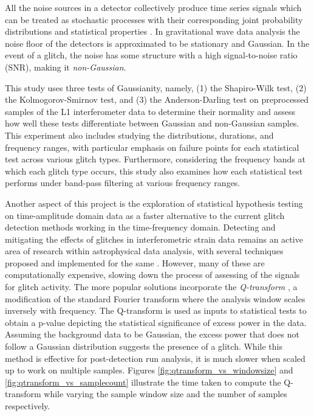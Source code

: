 \documentclass[12pt]{article}
\begin{document}

\medskip
\noindent All the noise sources in a detector collectively produce time series signals which can be treated as stochastic processes with their corresponding joint probability distributions and statistical properties \cite{collaboration_guide_2020}. In gravitational wave data analysis the noise floor of the detectors is approximated to be stationary and Gaussian. In the event of a glitch, the noise has some structure with a high signal-to-noise ratio (SNR), making it \textit{non-Gaussian}. 

\medskip
\noindent This study uses three tests of Gaussianity, namely, (1) the Shapiro-Wilk test, (2) the Kolmogorov-Smirnov test, and (3) the Anderson-Darling test on preprocessed samples of the L1 interferometer data to determine their normality and assess how well these tests differentiate between Gaussian and non-Gaussian samples. This experiment also includes studying the distributions, durations, and frequency ranges, with particular emphasis on failure points for each statistical test across various glitch types. Furthermore, considering the frequency bands at which each glitch type occurs, this study also examines how each statistical test performs under band-pass filtering at various frequency ranges.

\medskip
\noindent Another aspect of this project is the exploration of statistical hypothesis testing on time-amplitude domain data as a faster alternative to the current glitch detection methods working in the time-frequency domain. Detecting and mitigating the effects of glitches in interferometric strain data remains an active area of research within astrophysical data analysis, with several techniques proposed and implemented for the same \cite{robinet_omicron_2020, MACLEOD2021100657, davis_subtracting_2022}. However, many of these are computationally expensive, slowing down the process of assessing of the signals for glitch activity. The more popular solutions incorporate the \textit{Q-transform} \cite{chatterji_multiresolution_2004, vazsonyi_identifying_2023}, a modification of the standard Fourier transform where the analysis window scales inversely with frequency. The Q-transform is used as inputs to statistical tests to obtain a p-value depicting the statistical significance of excess power in the data. Assuming the background data to be Gaussian, the excess power that does not follow a Gaussian distribution suggests the presence of a glitch. While this method is effective for post-detection run analysis, it is much slower when scaled up to work on multiple samples. Figures \ref{fig:qtransform_vs_windowsize} and \ref{fig:qtransform_vs_samplecount} illustrate the time taken to compute the Q-transform while varying the sample window size and the number of samples respectively. 
\end{document}
